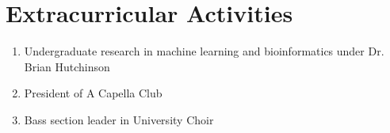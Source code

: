 \documentclass[12pt, letterpaper]{article}
\newcommand{\resumeItem}[1]{
  \item[$\bullet$]{
    #1 \vspace{-2pt}
  }
}
\begin{document}
\vspace{-15pt}

\section{Extracurricular Activities}
  \begin{enumerate}[noitemsep]
    \resumeItem
      {Undergraduate research in machine learning and bioinformatics under Dr. Brian Hutchinson}
    \resumeItem
      {President of A Capella Club}
    \resumeItem
      {Bass section leader in University Choir}
 \end{enumerate}%


\end{document}
